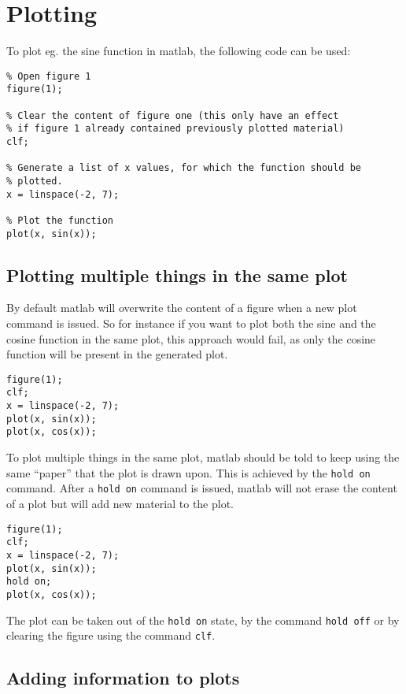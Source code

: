 \section{Plotting}

To plot eg. the sine function in matlab, the following code
can be used:
\begin{lstlisting}
% Open figure 1
figure(1);

% Clear the content of figure one (this only have an effect 
% if figure 1 already contained previously plotted material)
clf;

% Generate a list of x values, for which the function should be 
% plotted.
x = linspace(-2, 7);

% Plot the function
plot(x, sin(x));
\end{lstlisting}

\subsection{Plotting multiple things in the same plot}

By default matlab will overwrite the content of a figure
when a new plot command is issued.
So for instance if you want to plot both the sine and the cosine 
function in the same plot, this approach would fail, as only the 
cosine function will be present in the generated plot.

\begin{lstlisting}
figure(1);
clf; 
x = linspace(-2, 7);
plot(x, sin(x));
plot(x, cos(x));
\end{lstlisting}

To plot multiple things in the same plot, matlab should be told
to keep using the same ``paper'' that the plot is drawn upon.
This is achieved by the \verb!hold on! command.
After a \verb!hold on! command is issued, matlab will not erase 
the content of a plot but will add new material to the plot.

\begin{lstlisting}
figure(1);
clf; 
x = linspace(-2, 7);
plot(x, sin(x));
hold on;
plot(x, cos(x));
\end{lstlisting}

The plot can be taken out of the \verb!hold on! state, by the 
command \verb!hold off! or by clearing the figure using the 
command \verb!clf!.


\subsection{Adding information to plots}
\label{ssecAddingInformationToPlots}


